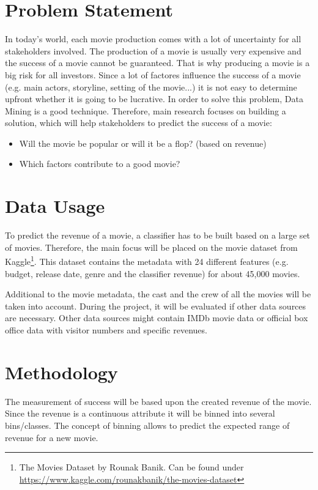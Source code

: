 

 
\section{Problem Statement}
 In today's world, each movie production comes with a lot of uncertainty for all stakeholders involved. The production of a movie is usually very expensive and the success of a movie cannot be guaranteed. That is why producing a movie is a big risk for all investors. 
Since a lot of factores influence the success of a movie (e.g. main actors, storyline, setting of the movie...) it is not easy to determine upfront whether it is going to be lucrative.
In order to solve this problem, Data Mining is a good technique. 
Therefore, main research focuses on building a solution, which will help stakeholders to predict the success of a movie:

\begin{itemize}
    \item Will the movie be popular or will it be a flop? (based on revenue)
    \item Which factors contribute to a good movie?
\end{itemize}


\section{Data Usage}
To predict the revenue of a movie, a classifier has to be built based on a large set of movies. Therefore, the main focus will be placed on the movie dataset from Kaggle\footnote{The Movies Dataset by Rounak Banik. Can be found under \url{https://www.kaggle.com/rounakbanik/the-movies-dataset}}. This dataset contains the metadata with 24 different features (e.g. budget, release date, genre and the classifier revenue) for about 45,000 movies. 

Additional to the movie metadata, the cast and the crew of all the movies will be taken into account. During the project, it will be evaluated if other data sources are necessary. Other data sources might contain IMDb movie data or official box office data with visitor numbers and specific revenues.


\section{Methodology}

The measurement of success will be based upon the created revenue of the movie. Since the revenue is a continuous attribute it will be binned into several bins/classes. The concept of binning allows to predict the expected range of revenue for a new movie.

